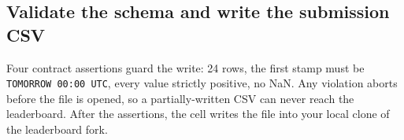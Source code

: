 \documentclass[
  english,
  letterpaper,
]{scrbook}
\begin{document}
\begin{figure}


\caption{\label{fig-live-predict}}

\end{figure}%

\subsection{Validate the schema and write the submission
CSV}\label{validate-the-schema-and-write-the-submission-csv}

Four contract assertions guard the write: 24 rows, the first stamp must
be \texttt{TOMORROW\ 00:00\ UTC}, every value strictly positive, no NaN.
Any violation aborts before the file is opened, so a partially-written
CSV can never reach the leaderboard. After the assertions, the cell
writes the file into your local clone of the leaderboard fork.
\end{document}
